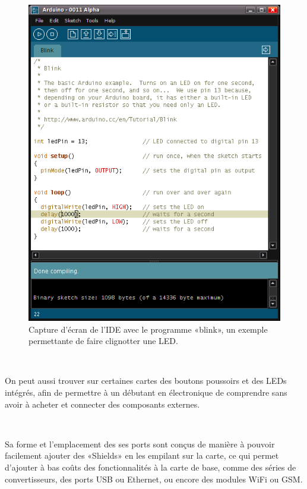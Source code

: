 \documentclass{article}
\begin{document}
\begin{figure}[h!]
    \centering\includegraphics[width=\linewidth/2]{img/arduino_ide.png}
    \caption{Capture d’écran de l’IDE avec le programme «blink», un exemple permettante de faire clignotter une LED.}
\end{figure}

~

On peut aussi trouver sur certaines cartes des boutons poussoirs et des LEDs intégrés, afin de permettre à un débutant en électronique de comprendre sans avoir à acheter et connecter des composants externes.

~

Sa forme et l’emplacement des ses ports sont conçus de manière à pouvoir facilement ajouter des «Shields» en les empilant sur la carte, ce qui permet d’ajouter à bas coûts des fonctionnalités à la carte de base, comme des séries de convertisseurs, des ports USB ou Ethernet, ou encore des modules WiFi ou GSM.
\end{document}
